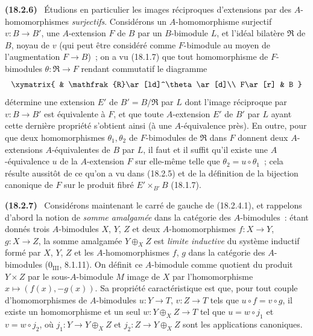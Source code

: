\documentclass[10pt,oneside]{book}
\makeatletter
\newcommand{\setmanualcurrentlabel}[1]{\def\@currentlabel{#1}}
\newcommand{\oldpage}[2][]{%
  \setcounter{footnote}{0}%
  \marginpar{\scriptsize\textbf{#1}~|~#2}\ignorespaces}
\newenvironment{env}[1][]{\setmanualcurrentlabel{#1}\par\medskip\noindent\textbf{(#1)}\ }{\par}
\makeatother
\begin{document}
\begin{env}[18.2.6]
\label{0.18.2.6-fr}
Étudions en particulier les images réciproques d'extensions par des
$A$-homomorphismes \emph{surjectifs}. Considérons un $A$-homomorphisme
surjectif $v:B\to B'$, une $A$-extension $F$ de $B$ par un $B$-bimodule $L$,
et l'idéal bilatère $\mathfrak{R}$ de $B$, noyau de $v$ (qui peut être
considéré comme $F$-bimodule au moyen de l'augmentation $F\to B$)~; on a vu
(18.1.7) que tout homomorphisme de $F$-bimodules
$\theta:\mathfrak{R}\to F$ rendant commutatif le diagramme
\[
  \xymatrix{
    & \mathfrak{R}\ar[ld]^\theta\ar[d]\\
    F\ar[r] & B
  }
\]
détermine une extension $E'$ de $B'=B/\mathfrak{R}$ par $L$ dont l'image
réciproque par $v:B\to B'$ est équivalente à $F$, et que toute $A$-extension
$E'$ de $B'$ par $L$ ayant cette dernière propriété s'obtient ainsi (à une
$A$-équivalence près). En outre, pour que deux homomorphismes
$\theta_1,\theta_2$ de $F$-bimodules de $\mathfrak{R}$ dans $F$ donnent deux
  $A$-extensions $A$-équivalentes de $B$ par $L$, il faut et il suffit qu'il
existe une $A$-équivalence $u$ de la $A$-extension $F$ sur elle-même telle que
\oldpage[0\textsubscript{IV-1}]{57}
$\theta_2=u\circ\theta_1$~; cela résulte aussitôt de ce qu'on a vu dans
(18.2.5) et de la définition de la bijection canonique de $F$ sur le produit
fibré $E'\times_{B'}B$ (18.1.7).
\end{env}

\begin{env}[18.2.7]
\label{0.18.2.7-fr}
Considérons maintenant le carré de gauche de (18.2.4.1), et rappelons d'abord
la notion de \emph{somme amalgamée} dans la catégorie des $A$-bimodules~:
étant donnés trois $A$-bimodules $X$, $Y$, $Z$ et deux $A$-homomorphismes
$f:X\to Y$, $g:X\to Z$, la somme amalgamée $Y\oplus_XZ$ est \emph{limite
inductive} du système inductif formé par $X$, $Y$, $Z$ et les
$A$-homomorphismes $f$, $g$ dans la catégorie des $A$-bimodules
($0_{\mathrm{III}}$, 8.1.11). On définit ce $A$-bimodule comme quotient du
produit $Y\times Z$ par le sous-$A$-bimodule $M$ image de $X$ par
l'homomorphisme $x\mapsto(f(x),-g(x))$. Sa propriété caractéristique est que,
pour tout couple d'homomorphismes de $A$-bimodules $u:Y\to T$, $v:Z\to T$
tels que $u\circ f=v\circ g$, il existe un homomorphisme et un seul
$w:Y\oplus_XZ\to T$ tel que $u=w\circ j_1$ et $v=w\circ j_2$, où
$j_1:Y\to Y\oplus_XZ$ et $j_2:Z\to Y\oplus_XZ$ sont les applications
canoniques.
\end{env}
\end{document}
